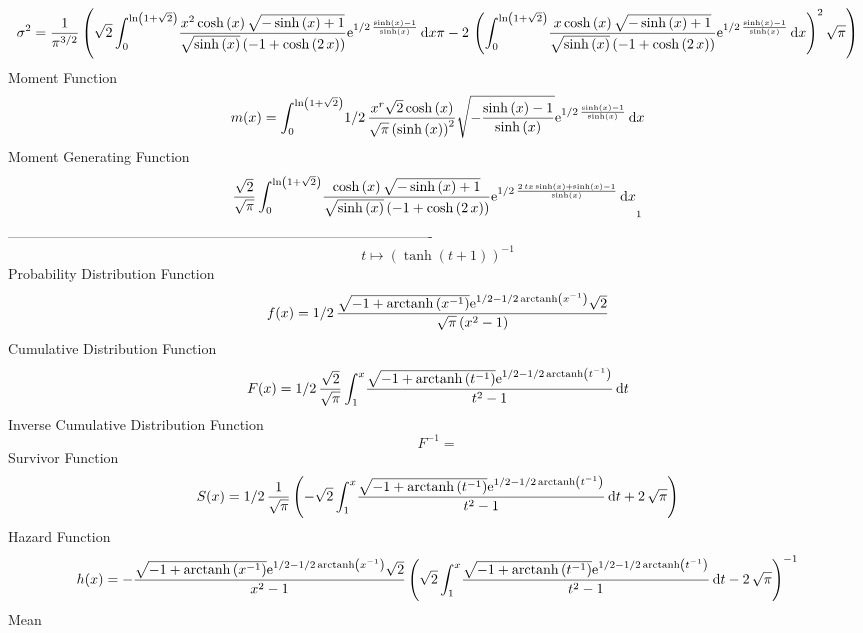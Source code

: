 \documentclass[12pt]{article}
\begin{document}
 $$ \sigma^2 = {\frac {1}{{\pi}^{3/2}} \left( \sqrt {2}\int_{0}^{\ln  \left( 1+\sqrt 
{2} \right) }\!{\frac {{x}^{2}\cosh \left( x \right) \sqrt {-\sinh
 \left( x \right) +1}}{\sqrt {\sinh \left( x \right) } \left( -1+\cosh
 \left( 2\,x \right)  \right) }{{\rm e}^{1/2\,{\frac {\sinh \left( x
 \right) -1}{\sinh \left( x \right) }}}}}\,{\rm d}x\pi-2\, \left( 
\int_{0}^{\ln  \left( 1+\sqrt {2} \right) }\!{\frac {x\cosh \left( x
 \right) \sqrt {-\sinh \left( x \right) +1}}{\sqrt {\sinh \left( x
 \right) } \left( -1+\cosh \left( 2\,x \right)  \right) }{{\rm e}^{1/2
\,{\frac {\sinh \left( x \right) -1}{\sinh \left( x \right) }}}}}
\,{\rm d}x \right) ^{2}\sqrt {\pi} \right) }
$$Moment Function 
 $$ m(x) = \int_{0}^{\ln  \left( 1+\sqrt {2} \right) }\!1/2\,{\frac {{x}^{r}
\sqrt {2}\cosh \left( x \right) }{\sqrt {\pi} \left( \sinh \left( x
 \right)  \right) ^{2}}\sqrt {-{\frac {\sinh \left( x \right) -1}{
\sinh \left( x \right) }}}{{\rm e}^{1/2\,{\frac {\sinh \left( x
 \right) -1}{\sinh \left( x \right) }}}}}\,{\rm d}x
$$ Moment Generating Function 
 $${\frac {\sqrt {2}}{\sqrt {\pi}}\int_{0}^{\ln  \left( 1+\sqrt {2}
 \right) }\!{\frac {\cosh \left( x \right) \sqrt {-\sinh \left( x
 \right) +1}}{\sqrt {\sinh \left( x \right) } \left( -1+\cosh \left( 2
\,x \right)  \right) }{{\rm e}^{1/2\,{\frac {2\,tx\sinh \left( x
 \right) +\sinh \left( x \right) -1}{\sinh \left( x \right) }}}}}
\,{\rm d}x}_{{1}}
$$-------------------------------------------------------------------------------------------  \\$$t\mapsto  \left( \tanh \left( t+1 \right)  \right) ^{-1}
$$Probability Distribution Function 
$$  f(x)=1/2\,{\frac {\sqrt {-1+{\rm arctanh} \left({x}^{-1}\right)}{{\rm e}^{1
/2-1/2\,{\rm arctanh} \left({x}^{-1}\right)}}\sqrt {2}}{\sqrt {\pi}
 \left( {x}^{2}-1 \right) }}
$$Cumulative Distribution Function  
 $$F(x)=1/2\,{\frac {\sqrt {2}}{\sqrt {\pi}}\int_{1}^{x}\!{\frac {\sqrt {-1+
{\rm arctanh} \left({t}^{-1}\right)}{{\rm e}^{1/2-1/2\,{\rm arctanh} 
\left({t}^{-1}\right)}}}{{t}^{2}-1}}\,{\rm d}t}
$$ Inverse Cumulative Distribution Function 
  $$F^{-1} = $$Survivor Function 
 $$ S(x)=1/2\,{\frac {1}{\sqrt {\pi}} \left( -\sqrt {2}\int_{1}^{x}\!{\frac {
\sqrt {-1+{\rm arctanh} \left({t}^{-1}\right)}{{\rm e}^{1/2-1/2\,
{\rm arctanh} \left({t}^{-1}\right)}}}{{t}^{2}-1}}\,{\rm d}t+2\,\sqrt 
{\pi} \right) }
$$ Hazard Function 
 $$ h(x)=-{\frac {\sqrt {-1+{\rm arctanh} \left({x}^{-1}\right)}{{\rm e}^{1/2-1
/2\,{\rm arctanh} \left({x}^{-1}\right)}}\sqrt {2}}{{x}^{2}-1} \left( 
\sqrt {2}\int_{1}^{x}\!{\frac {\sqrt {-1+{\rm arctanh} \left({t}^{-1}
\right)}{{\rm e}^{1/2-1/2\,{\rm arctanh} \left({t}^{-1}\right)}}}{{t}^
{2}-1}}\,{\rm d}t-2\,\sqrt {\pi} \right) ^{-1}}
$$Mean 
\end{document}
